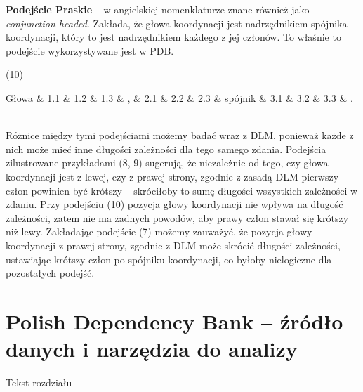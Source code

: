 \documentclass[licencjacka]{pracamgr_Kogni}
\begin{document}
\textbf{Podejście Praskie} -- w angielskiej nomenklaturze znane również jako \textit{conjunction-headed}. Zakłada, że głowa koordynacji jest nadrzędnikiem spójnika koordynacji, który to jest nadrzędnikiem każdego z jej członów. To właśnie to podejście wykorzystywane jest w PDB.

(10)

\begin{dependency}[theme = simple, group style = outer bubble]
    \centering
    \begin{deptext}[column sep=0.5cm]
       Głowa \& 1.1 \& 1.2 \& 1.3 \& , \& 2.1 \& 2.2 \& 2.3 \& spójnik \& 3.1 \& 3.2 \& 3.3 \& . \\
    \end{deptext}
\end{dependency}
\\
Różnice między tymi podejściami możemy badać wraz z DLM, ponieważ każde z nich może mieć inne długości zależności dla tego samego zdania. Podejścia zilustrowane przykładami (8, 9) sugerują, że niezależnie od tego, czy głowa koordynacji jest z lewej, czy z prawej strony, zgodnie z zasadą DLM pierwszy człon powinien być krótszy -- skróciłoby to sumę długości wszystkich zależności w zdaniu. Przy podejściu (10) pozycja głowy koordynacji nie wpływa na długość zależności, zatem nie ma żadnych powodów, aby prawy człon stawał się krótszy niż lewy. Zakładając podejście (7) możemy zauważyć, że pozycja głowy koordynacji z prawej strony, zgodnie z DLM może skrócić długości zależności, ustawiając krótszy człon po spójniku koordynacji, co byłoby nielogiczne dla pozostałych podejść.

\chapter{Polish Dependency Bank -- źródło danych i narzędzia do analizy}
Tekst rozdziału
\end{document}
